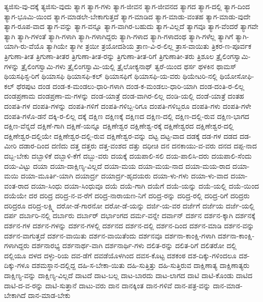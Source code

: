 {ತ್ಯಜಿಸು-ವು-ದಕ್ಕೆ
ತ್ಯಜಿಸು-ವುದು
ತ್ಯಾಗ
ತ್ಯಾಗ-ಗಳು
ತ್ಯಾಗ-ಜೀವನ
ತ್ಯಾಗ-ಜೀವನದ
ತ್ಯಾಗದ
ತ್ಯಾಗ-ದಲ್ಲಿ
ತ್ಯಾಗ-ದಿಂದ
ತ್ಯಾಗ-ಭೂಮಿ-ಯಿಂದ
ತ್ಯಾಗ-ಮಾಡಲೇ-ಬೇಕಾಗುತ್ತದೆ
ತ್ಯಾಗ-ಮಾಡಿದ
ತ್ಯಾಗ-ಮಾಡು-ವಂತಹ
ತ್ಯಾಗ-ಮಾಡು-ವುದೇ
ತ್ಯಾಗ-ರೂಪ-ವಾದ
ತ್ಯಾಗ-ವನ್ನು
ತ್ಯಾಗ-ವನ್ನೂ
ತ್ಯಾಗ-ವಾಗಿರ-ಬಹುದು
ತ್ಯಾಗ-ವಿಲ್ಲದೆ
ತ್ಯಾಗವೂ
ತ್ಯಾಗ-ವೆಂದರೆ
ತ್ಯಾಗವೇ
ತ್ಯಾಗಿ
ತ್ಯಾಗಿ-ಗಳಂತೆ
ತ್ಯಾಗಿ-ಗಳಾಗಿ
ತ್ಯಾಗಿ-ಗಳಾಗಿದ್ದರು
ತ್ಯಾಗಿ-ಗಳಾದ
ತ್ಯಾಗಿ-ಗಳಾದಂಥ
ತ್ಯಾಗಿ-ಗಳೆಲ್ಲ
ತ್ಯಾಗಿಗೆ
ತ್ಯಾಗಿ-ಯಾಗಿ-ರು-ವೆಯೊ
ತ್ಯಾಗಿಯೇ
ತ್ಯಾಗೀ
ತ್ರಯೀ
ತ್ರಯೋದಶಿಯ
ತ್ರಾಣ-ವಿ-ರ-ಲಿಲ್ಲ
ತ್ರಾಸ-ವಾಯಿತು
ತ್ರಿಕರ-ಣ-ಪೂರ್ವಕ
ತ್ರಿಗುಣಾ-ತೀತ
ತ್ರಿಗುಣಾ-ತೀತರ
ತ್ರಿಗುಣಾ-ತೀತ-ರನ್ನು
ತ್ರಿಗುಣಾ-ತೀತ-ರಿಗೆ
ತ್ರಿಗುಣಾತೀ-ತರು
ತ್ರಿಶೂಲ
ತ್ರೈಲಿಂಗಸ್ವಾಮಿ-ಗಳನ್ನು
ತ್ರೈಲಿಂಗಸ್ವಾಮಿ-ಗಳು
ತ್ರೈಲಿಂಗಸ್ವಾಮಿ-ಯಲ್ಲಿ
ತ್ರೈಲೋಕ್ಯನಾಥ್
ತ್ವರೆ-ಯಿಂದ
ಥರ್ಸ
ಥಳಕಿನ
ಥಾಮಸ್
ಥಿಯಸಫಿಸ್ಟ-ರಿಗೆ
ಥಿಯಾಸಫಿ
ಥಿಯಾಸಫಿ-ಕಲ್
ಥಿಯಾಸಫಿಗೆ
ಥಿಯಾಸಫಿ-ಯ-ವರು
ಥಿಯೇಟರಿ-ನಲ್ಲಿ
ಥಿಯೋಸೋಫಿ-ಕಲ್
ಥೆರಪುಟ
ದಂಡ
ದಂಡ-ಕ-ಮಂಡಲು-ಧಾರಿ-ಗಳಾಗಿ
ದಂಡ-ಕ-ಮಂಡಲು-ಧಾರಿ-ಯಾಗಿ
ದಂಡ-ದಂತಿ-ರ-ಲಿಲ್ಲ
ದಂಡಪ್ರಣಾಮ
ದಂಡಪ್ರಣಾ-ಮ-ಗಳನ್ನು
ದಂಡ-ಯಾತ್ರೆ
ದಂಡ-ವಾಗಿರ-ಲಿಲ್ಲ
ದಂಡಿ-ಯಲ್ಲಿ
ದಂಡೆ-ಯಾತ್ರೆ
ದಂತಹ
ದಂಪತಿ-ಗಳ
ದಂಪತಿ-ಗಳನ್ನು
ದಂಪತಿ-ಗಳಿಗೆ
ದಂಪತಿ-ಗಳಿಬ್ಬ-ರಿಗೂ
ದಂಪತಿ-ಗಳಿಬ್ಬರೂ
ದಂಪತಿ-ಗಳು
ದಂಪತಿ-ಗಳೇ
ದಂಪತಿ-ಗಳೊ-ಡನೆ
ದಕ್ಕಿ-ರ-ಲಿಲ್ಲ
ದಕ್ಕೆ
ದಕ್ಷಿಣ
ದಕ್ಷಿಣಕ್ಕೆ
ದಕ್ಷಿಣದ
ದಕ್ಷಿಣ-ದಲ್ಲಿ
ದಕ್ಷಿಣ-ದಲ್ಲಿ-ರುವ
ದಕ್ಷಿಣ-ಭಾಗದ
ದಕ್ಷಿಣ-ವೆನ್ನದೆ
ದಕ್ಷಿಣೆ-ಗಾಗಿ
ದಕ್ಷಿಣೆ-ಯನ್ನೂ
ದಕ್ಷಿಣೇಶ್ವರ
ದಕ್ಷಿಣೇಶ್ವ-ರಕ್ಕೆ
ದಕ್ಷಿಣೇಶ್ವರದ
ದಕ್ಷಿಣೇಶ್ವರ-ದಲ್ಲಿ
ದಕ್ಷಿಣೇಶ್ವರ-ದಲ್ಲಿಯೇ
ದಕ್ಷಿಣೇಶ್ವರ-ದಲ್ಲಿ-ರುವ
ದಕ್ಷಿಣೇಶ್ವರ-ವನ್ನು
ದಟ್ಟ
ದಟ್ಟ-ವಾದ
ದಡಕ್ಕೆ
ದಡ-ಗಳ
ದಡದ
ದಡ-ಮೀರಿ
ದಡಾರ-ದಿಂದ
ದಣಿದು
ದತ್ತ
ದತ್ತರು
ದತ್ತ-ವಂಶದ
ದತ್ತು
ದಧೀಚಿ
ದನ
ದನಕಾಯು-ವ-ವರು
ದನದ
ದಪ್ಪ-ನಾದ
ದಬ್ಬ-ಬೇಕು
ದಬ್ಬಾಳಿಕೆ
ದಬ್ಬಾಳಿ-ಕೆಗೆ
ದಬ್ಬು-ವರು
ದಯಕ್ಕೆ
ದಯಪಾಲಿ-ಸಲಿ
ದಯ-ಪಾಲಿಸಿ-ದರು
ದಯಪಾಲಿ-ಸೆಂದು
ದಯ-ವಿಟ್ಟು
ದಯಾ
ದಯಾ-ದಾಕ್ಷಿಣ್ಯ-ವಿಲ್ಲದೆ
ದಯಾ-ಮಯ
ದಯಾ-ಮಯ-ನಾದ
ದಯಾ-ಮಯ-ರಾದ
ದಯಾ-ಮಯಿ
ದಯಾ-ಮೂರ್ತಿ-ಯಾಗಿ
ದಯಾರ್ದ್ರ
ದಯಾರ್ದ್ರ-ಹೃದಯರು
ದಯಾ-ಳು-ಗಳು
ದಯಾ-ಳು-ವಾದ
ದಯಾ-ವಂತ-ರಾದ
ದಯಾ-ಸಿಂಧು
ದಯಾ-ಸಿಂಧುವೂ
ದಯೆ
ದಯೆ-ಗಾಗಿ
ದಯೆಗೆ
ದಯೆ-ಯನ್ನು
ದಯೆ-ಯಲ್ಲಿ
ದಯೆ-ಯಿಂದ
ದಯೆಯೇ
ದರ
ದರಿದ್ರ
ದರಿದ್ರ-ನ-ವ-ರೆಗೆ
ದರಿದ್ರ-ನಾರಾಯಣ-ನಿಗೆ
ದರಿದ್ರ-ರನ್ನು
ದರಿದ್ರ-ರಲ್ಲಿ
ದರಿದ್ರ-ರಿಗೆ
ದರಿದ್ರರು
ದರಿದ್ರರೂ
ದರಿದ್ರ-ಲಕ್ಷ್ಮಿ
ದರೋ-ಡೆ-ಗಾರನೋ
ದರೋ-ಡೆ-ಯನ್ನು
ದರ್ಜಿ-ಯ-ವರ
ದರ್ಜೆಗೆ
ದರ್ಜೆಯ
ದರ್ಜೆ-ಯಲ್ಲಿ
ದರ್ಪ
ದರ್ಬಾರಿ-ನಲ್ಲಿ
ದರ್ಬಾರು
ದರ್ಬಾರ್
ದರ್ಭಾಂಗದ
ದರ್ಮ-ವನ್ನೇ
ದರ್ವಾನ್
ದರ್ಶನ
ದರ್ಶನ-ಕ್ಕಾಗಿ
ದರ್ಶನಕ್ಕೆ
ದರ್ಶನ-ಗಳ
ದರ್ಶನ-ಗಳನ್ನು
ದರ್ಶನ-ಗಳಲ್ಲಿ
ದರ್ಶನದ
ದರ್ಶನ-ದಲ್ಲಿ
ದರ್ಶನ-ದಿಂದ
ದರ್ಶನ-ಮಾಡಿ
ದರ್ಶನ-ವನ್ನು
ದರ್ಶನ-ವಾಗುತ್ತದೆ
ದರ್ಶನ-ವಾಯಿತು
ದರ್ಶನ-ವಾಯಿತೆಂದು
ದರ್ಶನವೂ
ದರ್ಶನಾ-ಕಾಂಕ್ಷಿ-ಗಳಾಗಿ
ದರ್ಶನಾ-ಕಾಂಕ್ಷಿ-ಗಳಾಗಿದ್ದರು
ದರ್ಶನಾರಭ್ಯ
ದರ್ಶನಾರ್ಥ-ವಾಗಿ
ದರ್ಶನಾರ್ಥಿ-ಗಳು
ದಲಿತ-ರನ್ನು
ದಲಿತ-ರಿಗೆ
ದಲಿತರೋ
ದಲ್ಲಿ
ದಲ್ಲಿಯೂ
ದಳದ
ದಳ್ಳು-ರಿಯ
ದವ-ಡೆಗೆ
ದವಡೆಯೊಳಗಿಂದ
ದವಸ-ಕೊಟ್ಟ
ದಶಕಂಠ
ದಶ-ದಿಕ್ಕು-ಗಳಿಂದಲೂ
ದಶ-ದಿಕ್ಕು-ಗಳೂ
ದಶಮಸ್ಥಾನ-ದಲ್ಲಿದ್ದ
ದಹಿ-ಸ-ಬೇಕಾ-ಯಿತು
ದಹಿ-ಸುತ್ತಿತ್ತು
ದಹಿ-ಸುತ್ತಿರುವ
ದಾಕ್ಷಿಣಾತ್ಯ
ದಾಕ್ಷಿಣಾತ್ಯರು
ದಾಕ್ಷಿಣ್ಯ-ವನ್ನು
ದಾಕ್ಷಿಣ್ಯ-ವಿಲ್ಲದೆ
ದಾಟದೆ
ದಾಟ-ಬಲ್ಲ
ದಾಟ-ಬಾರದು
ದಾಟ-ಲಾಗದ
ದಾಟಿ
ದಾಟಿ-ಕೊಂಡು
ದಾಟಿದ
ದಾಟಿ-ದ-ವ-ರನ್ನು
ದಾಟಿ-ಸುತ್ತಾನೆ
ದಾಟು-ವರು
ದಾನ
ದಾನಕ್ಕಿಂತ
ದಾನ-ಗಳಿವೆ
ದಾನ-ಪತ್ರ-ವನ್ನು
ದಾನ-ಮಾಡ-ಬೇಕಾಗಿದೆ
ದಾನ-ಮಾಡ-ಬೇಕು
}
